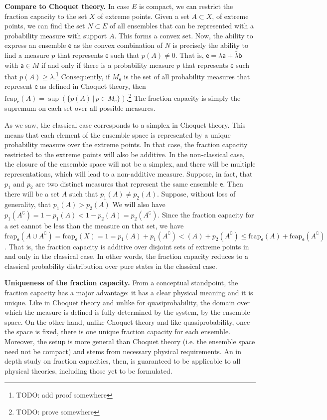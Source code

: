 \documentclass[10pt,twocolumn, nofootinbib]{revtex4-2}
\newcommand\frcap{\mathrm{fcap}}
\newcommand{\ens}[1][e] {\mathsf{#1}} %
\begin{document}
\textbf{Compare to Choquet theory.} In case $E$ is compact, we can restrict the fraction capacity to the set $X$ of extreme points. Given a set $A \subset X$, of extreme points, we can find the set $N \subset E$ of all ensembles that can be represented with a probability measure with support $A$. This forms a convex set. Now, the ability to express an ensemble $\ens$ as the convex combination of $N$ is precisely the ability to find a measure $p$ that represents $\ens$ such that $p(A) \neq 0$. That is, $\ens = \lambda \ens[a] + \bar{\lambda} \ens[b]$ with $\ens[a] \in M$ if and only if there is a probability measure $p$ that represents $\ens$ such that $p(A) \geq \lambda$.\footnote{TODO: add proof somewhere} Consequently, if $M_{\ens}$ is the set of all probability measures that represent $\ens$ as defined in Choquet theory, then $\frcap_{\ens}(A) = \sup(\{p(A) \, | \, p \in M_{\ens}\})$.\footnote{TODO: prove somewhere} The fraction capacity is simply the supremum on each set over all possible measures.

As we saw, the classical case corresponds to a simplex in Choquet theory. This means that each element of the ensemble space is represented by a unique probability measure over the extreme points. In that case, the fraction capacity restricted to the extreme points will also be additive. In the non-classical case, the closure of the ensemble space will not be a simplex, and there will be multiple representations, which will lead to a non-additive measure. Suppose, in fact, that $p_1$ and $p_2$ are two distinct measures that represent the same ensemble $\ens$. Then there will be a set $A$ such that $p_1(A) \neq p_2(A)$. Suppose, without loss of generality, that $p_1(A) > p_2(A)$ We will also have $p_1(A^{\complement}) = 1- p_1(A) < 1 - p_2(A) = p_2(A^{\complement})$. Since the fraction capacity for a set cannot be less than the measure on that set, we have $\frcap_{\ens}(A \cup A^{\complement})=\frcap_{\ens}(X) = 1 = p_1(A) + p_1(A^{\complement}) < (A) + p_2(A^{\complement}) \leq \frcap_{\ens}(A) + \frcap_{\ens}(A^{\complement})$. That is, the fraction capacity is additive over disjoint sets of extreme points in and only in the classical case. In other words, the fraction capacity reduces to a classical probability distribution over pure states in the classical case.

\textbf{Uniqueness of the fraction capacity.} From a conceptual standpoint, the fraction capacity has a major advantage: it has a clear physical meaning and it is unique. Like in Choquet theory and unlike for quasiprobability, the domain over which the measure is defined is fully determined by the system, by the ensemble space. On the other hand, unlike Choquet theory and like quasiprobability, once the space is fixed, there is one unique fraction capacity for each ensemble. Moreover, the setup is more general than Choquet theory (i.e. the ensemble space need not be compact) and stems from necessary physical requirements. An in depth study on fraction capacities, then, is guaranteed to be applicable to all physical theories, including those yet to be formulated.
\end{document}
